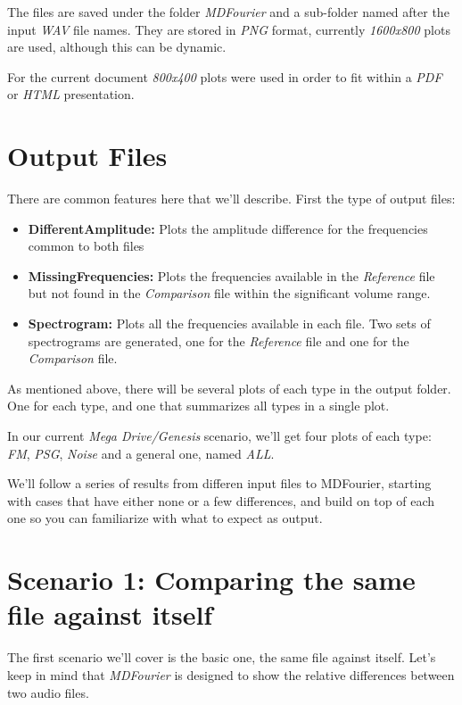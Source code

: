 \documentclass[10pt,a4paper]{report}
\begin{document}
The files are saved under the folder \textit{MDFourier} and a sub-folder named after the input \textit{WAV} file names. They are stored in \textit{PNG}\cite{libpng} format, currently \textit{1600x800} plots are used, although this can be dynamic. 

For the current document \textit{800x400} plots were used in order to fit within a \textit{PDF} or \textit{HTML} presentation.

\section{Output Files}
\label{outputfiles}
There are common features here that we'll describe. First the type of output files: 

\begin{itemize}
	\item \textbf{DifferentAmplitude:} Plots the amplitude difference for the frequencies common to both files
	\item \textbf{MissingFrequencies:} Plots the frequencies available in the \textit{Reference} file but not found in the \textit{Comparison} file within the significant volume range.
	\item \textbf{Spectrogram:} Plots all the frequencies available in each file. Two sets of spectrograms are generated, one for the \textit{Reference} file and one for the \textit{Comparison} file.
\end{itemize}

As mentioned above, there will be several plots of each type in the output folder. One for each type, and one that summarizes all types in a single plot.

In our current\textit{ Mega Drive/Genesis} scenario, we'll get four plots of each type: \textit{FM}, \textit{PSG}, \textit{Noise} and a general one, named \textit{ALL}.

We'll follow a series of results from differen input files to MDFourier, starting with cases that have either none or a few differences, and build on top of each one so you can familiarize with what to expect as output.

\section{Scenario 1: Comparing the same file against itself}

The first scenario we'll cover is the basic one, the same file against itself. Let's keep in mind that \textit{MDFourier} is designed to show the relative differences between two audio files.
\end{document}
